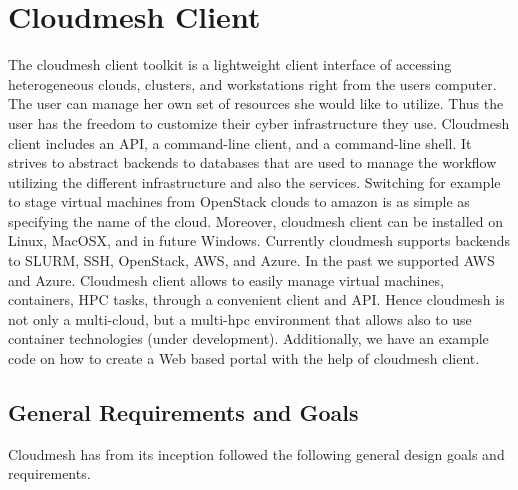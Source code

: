 \section{Cloudmesh Client}
\label{S:cmclient}

The cloudmesh client toolkit is a lightweight client interface of
accessing heterogeneous clouds, clusters, and workstations right from
the users computer. The user can manage her own set of resources she
would like to utilize. Thus the user has the freedom to customize
their cyber infrastructure they use. Cloudmesh client includes an API,
a command-line client, and a command-line shell. It strives to abstract
backends to databases that are used to manage the workflow utilizing
the different infrastructure and also the services. Switching for
example to stage virtual machines from OpenStack clouds to amazon is
as simple as specifying the name of the cloud. Moreover, cloudmesh
client can be installed on Linux, MacOSX, and in future
Windows. Currently cloudmesh supports backends to SLURM, SSH,
OpenStack, AWS, and Azure. In the past we supported AWS and Azure.
Cloudmesh client allows to easily manage virtual machines, containers,
HPC tasks, through a convenient client and API. Hence cloudmesh is not
only a multi-cloud, but a multi-hpc environment that allows also to
use container technologies (under development). Additionally, we have
an example code on how to create a Web based portal with the help of
cloudmesh client.

\subsection{General Requirements and Goals}

Cloudmesh has from its inception followed the following general design
goals and requirements.


